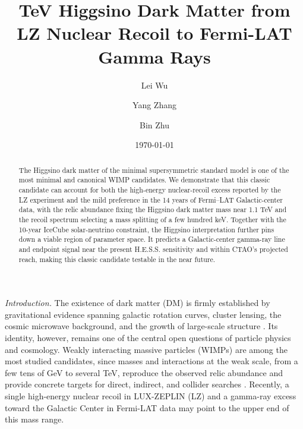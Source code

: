 \documentclass[%
  aps,
  prl,
  reprint,
  superscriptaddress,
  amsmath,
  amssymb,
  longbibliography
]{revtex4-2}
\begin{document}

\title{\textbf {TeV Higgsino Dark Matter from LZ Nuclear Recoil to Fermi-LAT Gamma Rays} 
}%

\author{Lei Wu}


\author{Yang Zhang}


\author{Bin Zhu}


\date{\today}%

\begin{abstract}
The Higgsino dark matter of the minimal supersymmetric standard model is one of the most minimal and canonical WIMP candidates. We demonstrate that this classic candidate can account for both the high-energy nuclear-recoil excess reported by the LZ experiment and the mild preference in the 14 years of Fermi–LAT Galactic-center data, with the relic abundance fixing the Higgsino dark matter mass near 1.1 TeV and the recoil spectrum selecting a mass splitting of a few hundred keV. Together with the 10-year IceCube solar-neutrino constraint, the Higgsino interpretation further pins down a viable region of parameter space. It predicts a Galactic-center gamma-ray line and endpoint signal near the present H.E.S.S. sensitivity and within CTAO's projected reach, making this classic candidate testable in the near future.
\end{abstract}

\maketitle


{\it Introduction.} The existence of dark matter (DM) is firmly established by gravitational evidence spanning galactic rotation curves, cluster lensing, the cosmic microwave background, and the growth of large-scale structure \cite{Bertone:2004pz}.  Its identity, however, remains one of the central open questions of particle physics and cosmology.  Weakly interacting massive particles (WIMPs) are among the most studied candidates, since masses and interactions at the weak scale, from a few tens of GeV to several TeV, reproduce the observed relic abundance and provide concrete targets for direct, indirect, and collider searches \cite{Jungman:1995df}. Recently, a single high-energy nuclear recoil in LUX-ZEPLIN (LZ) and a gamma-ray excess toward the Galactic Center in Fermi-LAT data may point to the upper end of this mass range.
\end{document}
